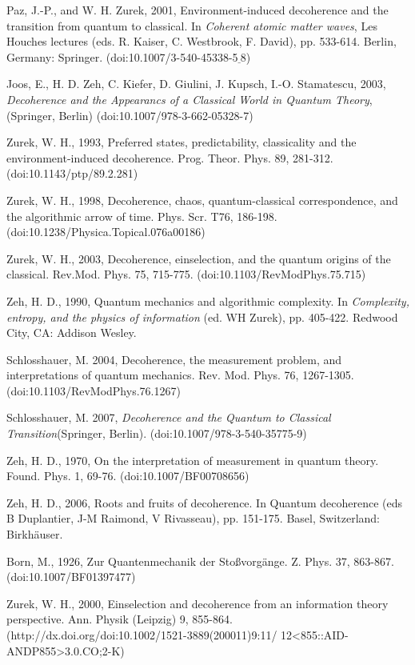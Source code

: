 \documentclass[aps,amsmath,amssymb,amsfonts,12pt]{revtex4-1}
\newcommand{\+}         {\dagger}
\begin{document}
{{{\begin{references}
 Paz, J.-P., and W. H. Zurek, 2001, Environment-induced decoherence and the transition from quantum to classical. In {\it Coherent atomic matter waves}, Les Houches lectures (eds. R. Kaiser, C. Westbrook, F. David), pp. 533-614. Berlin, Germany: Springer. (doi:10.1007/3-540-45338-5$\underline \ $8)

 Joos, E., H. D. Zeh, C. Kiefer, D. Giulini, J. Kupsch,
I.-O. Stamatescu, 2003, {\it Decoherence and the Appearancs of
a Classical World in Quantum Theory}, (Springer, Berlin) (doi:10.1007/978-3-662-05328-7)

 Zurek, W. H., 1993, Preferred states, predictability, classicality and the environment-induced
decoherence. Prog. Theor. Phys. 89, 281-312. (doi:10.1143/ptp/89.2.281)

 Zurek, W. H.,  1998, Decoherence, chaos, quantum-classical correspondence, and the algorithmic arrow of time. Phys. Scr. T76, 186-198. (doi:10.1238/Physica.Topical.076a00186)

 Zurek, W. H., 2003, Decoherence, einselection, and the quantum origins of the classical. Rev.Mod.
Phys. 75, 715-775. (doi:10.1103/RevModPhys.75.715)

 Zeh, H. D., 1990, Quantum mechanics and algorithmic complexity. In {\it Complexity, entropy,
and the physics of information} (ed. WH Zurek), pp. 405-422. Redwood City, CA: Addison
Wesley.

 Schlosshauer, M. 2004, Decoherence, the measurement problem, and interpretations of
quantum mechanics. Rev. Mod. Phys. 76, 1267-1305. (doi:10.1103/RevModPhys.76.1267)

 Schlosshauer, M. 2007, {\it Decoherence and the Quantum to Classical Transition}(Springer, Berlin). (doi:10.1007/978-3-540-35775-9)

 Zeh, H. D., 1970, On the interpretation of measurement in quantum theory. Found. Phys. 1, 69-76.
(doi:10.1007/BF00708656)

 Zeh, H. D., 2006, Roots and fruits of decoherence. In Quantum decoherence (eds B Duplantier, J-M
Raimond, V Rivasseau), pp. 151-175. Basel, Switzerland: Birkhäuser.

 Born, M., 1926, Zur Quantenmechanik der Stoßvorgänge. Z. Phys. 37, 863-867.
(doi:10.1007/BF01397477)

 Zurek, W. H., 2000, Einselection and decoherence from an information theory perspective.
Ann. Physik (Leipzig) 9, 855-864. (http://dx.doi.org/doi:10.1002/1521-3889(200011)9:11/
12<855::AID-ANDP855>3.0.CO;2-K)


\end{references}}}}
\end{document}
